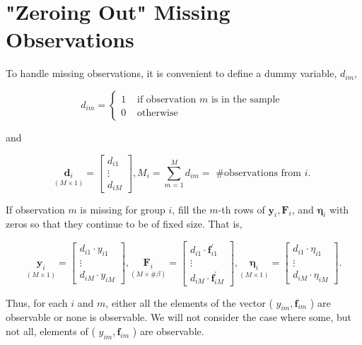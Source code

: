 \documentclass[10pt]{article}
\begin{document}
\section*{"Zeroing Out" Missing Observations}
To handle missing observations, it is convenient to define a dummy variable, $d_{i m}$,

\[
d_{i m}= \begin{cases}1 & \text { if observation } m \text { is in the sample }  \tag{5.3.1}\\ 0 & \text { otherwise }\end{cases}
\]

and

\[
\underset{(M \times 1)}{\mathbf{d}_{i}}=\left[\begin{array}{c}
d_{i 1}  \tag{5.3.2}\\
\vdots \\
d_{i M}
\end{array}\right], M_{i}=\sum_{m=1}^{M} d_{i m}=\text { \# observations from } i \text {. }
\]

If observation $m$ is missing for group $i$, fill the $m$-th rows of $\mathbf{y}_{i}, \mathbf{F}_{i}$, and $\boldsymbol{\eta}_{i}$ with zeros so that they continue to be of fixed size. That is,

\[
\underset{(M \times 1)}{\mathbf{y}_{i}}=\left[\begin{array}{c}
d_{i 1} \cdot y_{i 1}  \tag{5.3.3}\\
\vdots \\
d_{i M} \cdot y_{i M}
\end{array}\right], \underset{(M \times \# \beta)}{\mathbf{F}_{i}}=\left[\begin{array}{c}
d_{i 1} \cdot \mathbf{f}_{i 1}^{\prime} \\
\vdots \\
d_{i M} \cdot \mathbf{f}_{i M}^{\prime}
\end{array}\right], \underset{(M \times 1)}{\boldsymbol{\eta}_{i}}=\left[\begin{array}{c}
d_{i 1} \cdot \eta_{i 1} \\
\vdots \\
d_{i M} \cdot \eta_{i M}
\end{array}\right] .
\]

Thus, for each $i$ and $m$, either all the elements of the vector ( $y_{i m}, \mathbf{f}_{i m}$ ) are observable or none is observable. We will not consider the case where some, but not all, elements of ( $y_{i m}, \mathbf{f}_{i m}$ ) are observable.
\end{document}
